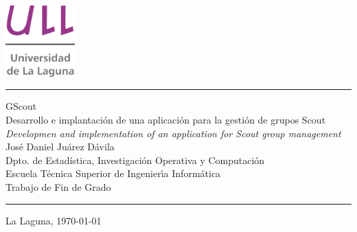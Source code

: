 \documentclass[spanish,a4paper,11pt,twoside]{report}
\begin{document}

\pagestyle{empty}
\thispagestyle{empty}


\newcommand{\HRule}{\rule{\linewidth}{1mm}}
\setlength{\parindent}{0mm}
\setlength{\parskip}{0mm}

\begin{center}
\includegraphics[width=0.2\textwidth]{images/logotipo-secundario-ULL}\\[0.25cm]
\end{center}

\HRule
\begin{flushright}
        {\Huge GScout} \\[2.5mm] 
        {\Huge Desarrollo e implantación de una 
        aplicación para la gestión de grupos Scout} \\[2.5mm]
        {\Large \textit{Developmen and implementation of an application for Scout group management}} \\[5mm]
        {\Large José Daniel Juárez Dávila} \\[5mm]
        Dpto. de Estadística, Investigación Operativa y Computación \\[5mm]
        Escuela T\'ecnica Superior de Ingenier\'{\i}a Inform\'atica \\[5mm]
        
        Trabajo de Fin de Grado \\
\end{flushright}
\HRule
{}
\begin{center}
  \Large La Laguna, \today 
\end{center}

\setlength{\parindent}{5mm}

\cleardoublepage
\thispagestyle{empty}
\end{document}
